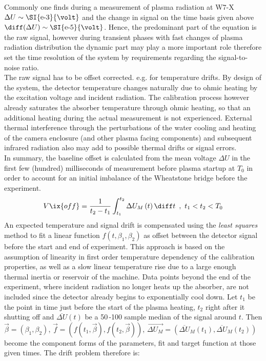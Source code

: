 %
                Commonly one finds during a measurement of plasma radiation at W7-X $\Delta U\sim\text{\SI{e-3}{\volt}}$ and the change in signal on the time basis given above $\diff(\Delta U)\sim\text{\SI{e-5}{\volt}}$. Hence, the predominant part of the equation is the raw signal, however during transient phases with fast changes of plasma radiation distribution the dynamic part may play a more important role therefore set the time resolution of the system by requirements regarding the signal-to-noise ratio.\\%
                The raw signal has to be offset corrected. e.g. for temperature drifts. By design of the system, the detector temperature changes naturally due to ohmic heating by the excitation voltage and incident radiation. The calibration process however already saturates the absorber temperature through ohmic heating, so that an additional heating during the actual measurement is not experienced. External thermal interference through the perturbations of the water cooling and heating of the camera enclosure (and other plasma facing components) and subsequent infrared radiation also may add to possible thermal drifts or signal errors.\\%
                In summary, the baseline offset is calculated from the mean voltage $\Delta U$ in the first few (hundred) milliseconds of measurement before plasma startup at $T_{0}$ in order to account for an initial imbalance of the Wheatstone bridge before the experiment.%
%
                \begin{align}%
                    V\ix{off}=\frac{1}{t_{2}-t_{1}}\int_{t_{1}}^{t_{2}}\Delta U_{M}\left(t\right)\diff t\,\,\,,\,\,t_{1}<t_{2}<T_{0}\label{eq:offset}
                \end{align}%
%
                An expected temperature and signal drift is compensated using the \textit{least squares} method to fit a linear function $f\left(t, \beta_{1}, \beta_{2}\right)$ as offset between the detector signal before the start and end of experiment. This approach is based on the assumption of linearity in first order temperature dependency of the calibration properties, as well as a slow linear temperature rise due to a large enough thermal inertia or reservoir of the machine. Data points beyond the end of the experiment, where incident radiation no longer heats up the absorber, are not included since the detector already begins to exponentially cool down. Let $t_{1}$ be the point in time just before the start of the plasma heating, $t_{2}$ right after it shutting off and $\overline{\Delta U}\left(t\right)$ be a 50\,-100 sample median of the signal around $t$. Then $\vec{\beta}=\left(\beta_{1}, \beta_{2}\right)$, $\vec{f}=\left(f\left(t_{1},\vec{\beta}\right), f\left(t_{2}, \vec{\beta}\right)\right)$, $\vec{\Delta U_{M}}=\left(\overline{\Delta U}_{M}\left(t_{1}\right), \overline{\Delta U}_{M}\left(t_{2}\right)\right)$ become the component forms of the parameters, fit and target function at those given times. The drift problem therefore is:%
